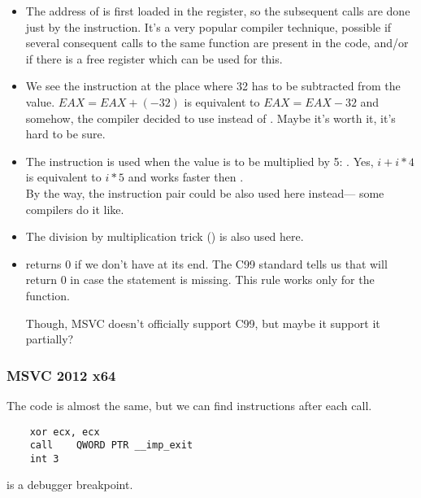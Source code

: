 \begin{itemize}
\item The address of \printf is first loaded in the 
\ESI register, so the subsequent
\printf calls are done just by the  instruction.
It's a very popular compiler 
technique, possible if several consequent calls to the same function are present
in the code, and/or if there is a free register which can be used for this.

\item We see the  
instruction at the place where 32 has to be subtracted from the value.
$EAX=EAX+(-32)$ is equivalent to $EAX=EAX-32$ 
and somehow, the compiler decided to use  instead of .
Maybe it's worth it, it's hard to be sure.

\item The \LEA instruction is used when 
the value is to be multiplied by 5: .
Yes, $i+i*4$ is equivalent to $i*5$ and \LEA 
works faster then .\\
By the way, the  instruction pair could be also used here instead---
some compilers do it like.

\item The division by multiplication trick () 
is also used here.

\item \main returns 0 if we don't have  
at its end.
The C99 standard tells us  that \main 
will return 0 in case the 
 statement is missing.
This rule works only for the \main function.

Though, MSVC doesn't officially support C99, but maybe it support it partially?
\end{itemize}

\subsubsection{\Optimizing MSVC 2012 x64}

The code is almost the same, but we can find  instructions after each  call.

\begin{lstlisting}
	xor	ecx, ecx
	call	QWORD PTR __imp_exit
	int	3
\end{lstlisting}

 is a debugger breakpoint.

